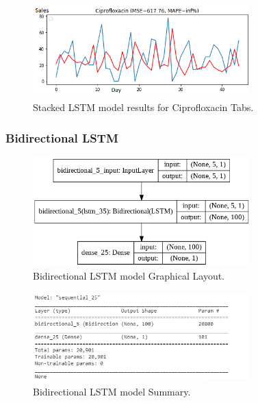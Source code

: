 \documentclass[12pt]{report}
\begin{document}
\begin{figure}[H]%
  \begin {center}
  \includegraphics[width=0.75\textwidth]{images/stacked (3)B.png}
  \caption{Stacked LSTM model results for Ciprofloxacin Tabs.}
  \label{fig:ecg}
  \end {center}
\end{figure}
  

\subsubsection{Bidirectional LSTM}


\begin{figure}[H]%
\begin {center}
\includegraphics[width=0.75\textwidth]{Bidirectional.png}
\caption{Bidirectional LSTM model Graphical Layout.}
\label{fig:ecg}
\end {center}
\end{figure}

\begin{figure}[H]%
\begin {center}
\includegraphics[width=0.75\textwidth]{Bidirectional1.png}
\caption{Bidirectional LSTM model Summary.}
\label{fig:ecg}
\end {center}
\end{figure}
\end{document}
